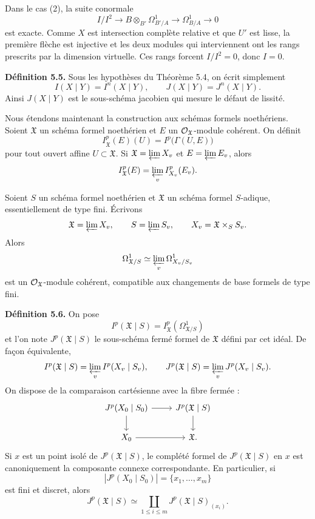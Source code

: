 \documentclass[11pt]{article}
\begin{document}
Dans le cas (2), la suite conormale
\[
        I/I^2\longrightarrow
        B\otimes_{B'}\Omega^1_{B'/A}
        \longrightarrow
        \Omega^1_{B/A}\longrightarrow 0
\]
est exacte.  Comme \(X\) est intersection complète relative et que \(U'\) est lisse, la première flèche est injective et les deux modules qui interviennent ont les rangs prescrits par la dimension virtuelle.  Ces rangs forcent \(I/I^2=0\), donc \(I=0\).

\textbf{Définition 5.5.}  Sous les hypothèses du Théorème 5.4, on écrit simplement
\[
        I(X\mid Y)=I^n(X\mid Y),\qquad
        J(X\mid Y)=J^n(X\mid Y).
\]
Ainsi \(J(X\mid Y)\) est le sous-schéma jacobien qui mesure le défaut de lissité.

Nous étendons maintenant la construction aux schémas formels noethériens.  Soient \(\mathfrak X\) un schéma formel noethérien et \(E\) un \(\mathcal O_{\mathfrak X}\)-module cohérent.  On définit
\[
        I^p_{\mathfrak X}(E)(U)=I^p\bigl(\Gamma(U,E)\bigr)
\]
pour tout ouvert affine \(U\subset\mathfrak X\).  Si \(\mathfrak X=\varprojlim X_v\) et \(E=\varprojlim E_v\), alors
\[
        I^p_{\mathfrak X}(E)=\varprojlim_v I^p_{X_v}(E_v).
\]

Soient \(S\) un schéma formel noethérien et \(\mathfrak X\) un schéma formel \(S\)-adique, essentiellement de type fini.  Écrivons
\[
        \mathfrak X=\varprojlim X_v,\qquad S=\varprojlim S_v,\qquad
        X_v=\mathfrak X\times_S S_v.
\]
Alors
\[
        \Omega^1_{\mathfrak X/S}\simeq \varprojlim_v\Omega^1_{X_v/S_v}
\]
est un \(\mathcal O_{\mathfrak X}\)-module cohérent, compatible aux changements de base formels de type fini.

\textbf{Définition 5.6.}  On pose
\[
        I^p(\mathfrak X\mid S)=I^p_{\mathfrak X}(\Omega^1_{\mathfrak X/S})
\]
et l'on note \(J^p(\mathfrak X\mid S)\) le sous-schéma fermé formel de \(\mathfrak X\) défini par cet idéal.  De façon équivalente,
\[
        I^p(\mathfrak X\mid S)=\varprojlim_v I^p(X_v\mid S_v),
        \qquad
        J^p(\mathfrak X\mid S)=\varprojlim_v J^p(X_v\mid S_v).
\]
On dispose de la comparaison cartésienne avec la fibre fermée :
\[
\begin{tikzcd}
J^p(X_0\mid S_0) \arrow[r] \arrow[d] &
J^p(\mathfrak X\mid S) \arrow[d]\\
X_0 \arrow[r] & \mathfrak X .
\end{tikzcd}
\]
Si \(x\) est un point isolé de \(J^p(\mathfrak X\mid S)\), le complété formel de \(J^p(\mathfrak X\mid S)\) en \(x\) est canoniquement la composante connexe correspondante.  En particulier, si
\[
        |J^p(X_0\mid S_0)|=\{x_1,\ldots,x_m\}
\]
est fini et discret, alors
\[
        J^p(\mathfrak X\mid S)
        \simeq
        \coprod_{1\leq i\leq m} J^p(\mathfrak X\mid S)_{(x_i)}.
\]
\end{document}
